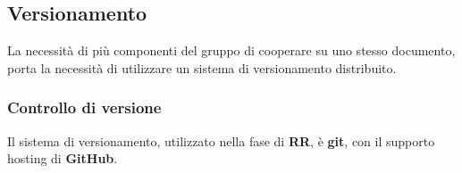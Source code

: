 \subsection{Versionamento}\label{ProcessiSupporto_Versionamento}
La necessità di più componenti del gruppo di cooperare su uno stesso documento, porta la necessità di utilizzare un sistema di versionamento distribuito. 



\subsubsection{Controllo di versione}
Il sistema di versionamento, utilizzato nella fase di \textbf{RR}, è \textbf{git}, con il supporto hosting di \textbf{GitHub}.

